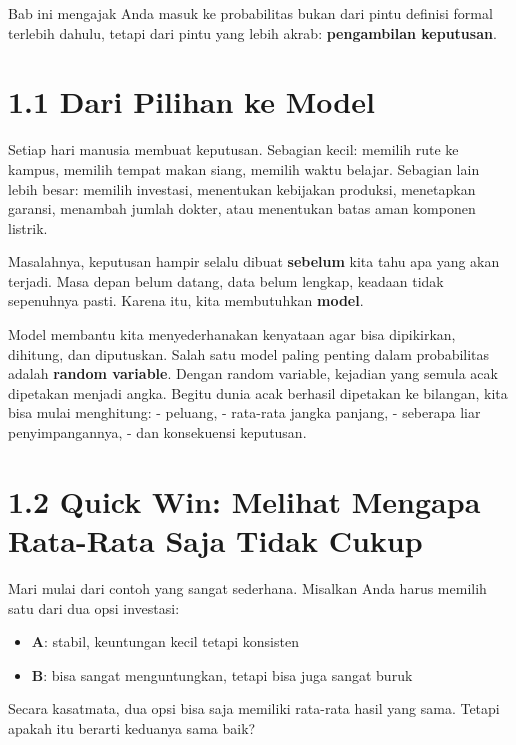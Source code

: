 \documentclass[
  letterpaper,
  DIV=11,
  numbers=noendperiod]{scrreprt}
\providecommand{\tightlist}{%
  \setlength{\itemsep}{0pt}\setlength{\parskip}{0pt}}
\begin{document}
Bab ini mengajak Anda masuk ke probabilitas bukan dari pintu definisi
formal terlebih dahulu, tetapi dari pintu yang lebih akrab:
\textbf{pengambilan keputusan}.

\section{1.1 Dari Pilihan ke Model}\label{dari-pilihan-ke-model}

Setiap hari manusia membuat keputusan. Sebagian kecil: memilih rute ke
kampus, memilih tempat makan siang, memilih waktu belajar. Sebagian lain
lebih besar: memilih investasi, menentukan kebijakan produksi,
menetapkan garansi, menambah jumlah dokter, atau menentukan batas aman
komponen listrik.

Masalahnya, keputusan hampir selalu dibuat \textbf{sebelum} kita tahu
apa yang akan terjadi. Masa depan belum datang, data belum lengkap,
keadaan tidak sepenuhnya pasti. Karena itu, kita membutuhkan
\textbf{model}.

Model membantu kita menyederhanakan kenyataan agar bisa dipikirkan,
dihitung, dan diputuskan. Salah satu model paling penting dalam
probabilitas adalah \textbf{random variable}. Dengan random variable,
kejadian yang semula acak dipetakan menjadi angka. Begitu dunia acak
berhasil dipetakan ke bilangan, kita bisa mulai menghitung: - peluang, -
rata-rata jangka panjang, - seberapa liar penyimpangannya, - dan
konsekuensi keputusan.

\section{1.2 Quick Win: Melihat Mengapa Rata-Rata Saja Tidak
Cukup}\label{quick-win-melihat-mengapa-rata-rata-saja-tidak-cukup}

Mari mulai dari contoh yang sangat sederhana. Misalkan Anda harus
memilih satu dari dua opsi investasi:

\begin{itemize}
\tightlist
\item
  \textbf{A}: stabil, keuntungan kecil tetapi konsisten
\item
  \textbf{B}: bisa sangat menguntungkan, tetapi bisa juga sangat buruk
\end{itemize}

Secara kasatmata, dua opsi bisa saja memiliki rata-rata hasil yang sama.
Tetapi apakah itu berarti keduanya sama baik?
\end{document}
